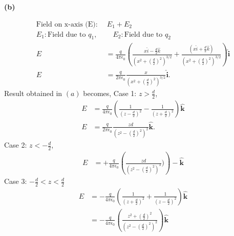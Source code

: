 \documentclass{article}
\begin{document}
\textbf{(b)}
\begin{figure}[!ht]
\centering
{}%

\label{fig:my_label}
\end{figure}
\begin{align*}
\text{Field on x-axis (E): } & \, E_1 + E_2 \\
E_1: \text{Field due to } q_1, & \quad E_2: \text{Field due to } q_2 \\
E &= \frac{q}{4 \pi \epsilon_0} 
\left( 
\frac{x\hat{i} - \frac{d}{2} \hat{k}}{\left(x^2 + \left(\frac{d}{2}\right)^2\right)^{3/2}} 
+ 
\frac{\left(x \hat{i} + \frac{d}{2}\hat{k}\right)}{\left(x^2 + \left(\frac{d}{2}\right)^2\right)^{3/2}}
\right) \mathbf{\hat{i}}
\\
E &= \frac{q}{2 \pi \epsilon_0} 
\frac{x}{\left(x^2 + \left(\frac{d}{2}\right)^2\right)^{3/2}} \mathbf{\hat{i}}.
\end{align*}
\textbf{} Result obtained in $(a)$ becomes,\newline 
Case 1: $z > \frac{d}{2}$,
\begin{align*}
E &= \frac{q}{4 \pi \epsilon_0} 
\left( 
\frac{1}{(z - \frac{d}{2})^2} - 
\frac{1}{(z + \frac{d}{2})^2}
\right) \mathbf{\hat{k}} \\ 
E &= \frac{q}{2 \pi \epsilon_0} 
\frac{zd}{(z^2 - (\frac{d}{2})^2)^2} \mathbf{\hat{k}}.
\end{align*}
Case 2: $z < -\frac{d}{2}$, 
\begin{align*}
E &= +\frac{q}{4 \pi \epsilon_0} 
\left( 
\frac{zd}{(z^2 - (\frac{d}{2})^2)^3} )
\right)-\mathbf{\hat{k}}
\end{align*}
Case 3: $-\frac{d}{2} < z < \frac{d}{2}$
\begin{align*}
E &= -\frac{q}{4 \pi \epsilon_0} 
\left( 
\frac{1}{(z + \frac{d}{2})^2} + 
\frac{1}{(z - \frac{d}{2})^2}
\right) \mathbf{\hat{k}} \\ 
&= -\frac{q}{4 \pi \epsilon_0} 
\left( 
\frac{z^2 + (\frac{d}{2})^2}{ (z^2 - (\frac{d}{2})^2)^2 } \right) \mathbf{\hat{k}}
\end{align*}
\end{document}
